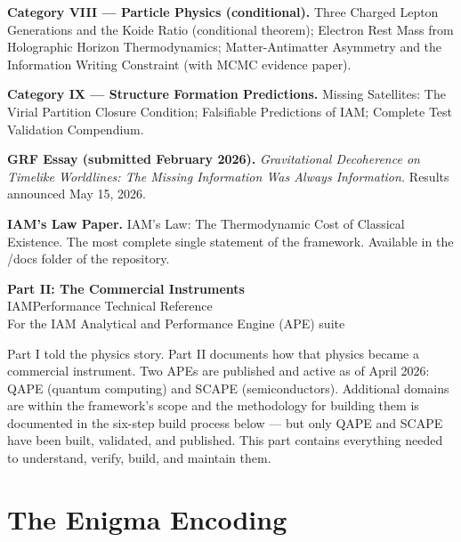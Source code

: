 \documentclass[12pt,a4paper]{article}
\begin{document}
\textbf{Category VIII --- Particle Physics (conditional).}
Three Charged Lepton Generations and the Koide Ratio (conditional theorem);
Electron Rest Mass from Holographic Horizon Thermodynamics;
Matter-Antimatter Asymmetry and the Information Writing Constraint
(with MCMC evidence paper).

\textbf{Category IX --- Structure Formation Predictions.}
Missing Satellites: The Virial Partition Closure Condition;
Falsifiable Predictions of IAM;
Complete Test Validation Compendium.

\textbf{GRF Essay (submitted February 2026).}
\textit{Gravitational Decoherence on Timelike Worldlines: The Missing
Information Was Always Information.}
Results announced May 15, 2026.

\textbf{IAM's Law Paper.}
IAM's Law: The Thermodynamic Cost of Classical Existence.
The most complete single statement of the framework.
Available in the /docs folder of the repository.

\newpage


\newpage
\begin{center}
{\Large\bfseries\color{deepblue} Part II: The Commercial Instruments}\\[0.5em]
{\normalsize\color{darkgray}
IAMPerformance Technical Reference\\
For the IAM Analytical and Performance Engine (APE) suite}
\end{center}

\medskip
\noindent
Part I told the physics story. Part II documents how that physics became a
commercial instrument. Two APEs are published and active as of April 2026:
QAPE (quantum computing) and SCAPE (semiconductors). Additional domains
are within the framework's scope and the methodology for building them is
documented in the six-step build process below --- but only QAPE and SCAPE
have been built, validated, and published. This part contains everything
needed to understand, verify, build, and maintain them.

\newpage

\section{The Enigma Encoding}
\end{document}
